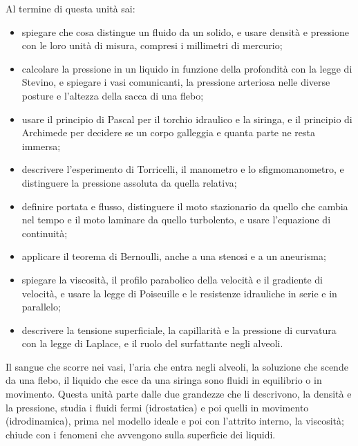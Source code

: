\dispensa

\begin{tcolorbox}[fisbox={formula}{formulaBg},title={Obiettivi dell'unità}]
Al termine di questa unità sai:
\begin{itemize}
  \item spiegare che cosa distingue un fluido da un solido, e usare densità e pressione con le loro unità di misura, compresi i millimetri di mercurio;
  \item calcolare la pressione in un liquido in funzione della profondità con la legge di Stevino, e spiegare i vasi comunicanti, la pressione arteriosa nelle diverse posture e l'altezza della sacca di una flebo;
  \item usare il principio di Pascal per il torchio idraulico e la siringa, e il principio di Archimede per decidere se un corpo galleggia e quanta parte ne resta immersa;
  \item descrivere l'esperimento di Torricelli, il manometro e lo sfigmomanometro, e distinguere la pressione assoluta da quella relativa;
  \item definire portata e flusso, distinguere il moto stazionario da quello che cambia nel tempo e il moto laminare da quello turbolento, e usare l'equazione di continuità;
  \item applicare il teorema di Bernoulli, anche a una stenosi e a un aneurisma;
  \item spiegare la viscosità, il profilo parabolico della velocità e il gradiente di velocità, e usare la legge di Poiseuille e le resistenze idrauliche in serie e in parallelo;
  \item descrivere la tensione superficiale, la capillarità e la pressione di curvatura con la legge di Laplace, e il ruolo del surfattante negli alveoli.
\end{itemize}
\end{tcolorbox}

Il sangue che scorre nei vasi, l'aria che entra negli alveoli, la soluzione che scende da una flebo, il liquido che esce da una siringa sono fluidi in equilibrio o in movimento. Questa unità parte dalle due grandezze che li descrivono, la densità e la pressione, studia i fluidi fermi (idrostatica) e poi quelli in movimento (idrodinamica), prima nel modello ideale e poi con l'attrito interno, la viscosità; chiude con i fenomeni che avvengono sulla superficie dei liquidi.

